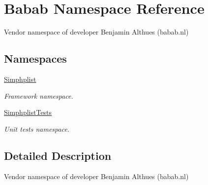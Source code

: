 \hypertarget{namespaceBabab}{\section{Babab Namespace Reference}
\label{namespaceBabab}
}


Vendor namespace of developer Benjamin Althues (babab.\+nl)  


\subsection*{Namespaces}
\begin{DoxyCompactItemize}
\item 
 \hyperlink{namespaceBabab_1_1Simphplist}{Simphplist}
\begin{DoxyCompactList}\small\item\em Framework namespace. \end{DoxyCompactList}\item 
 \hyperlink{namespaceBabab_1_1SimphplistTests}{Simphplist\+Tests}
\begin{DoxyCompactList}\small\item\em Unit tests namespace. \end{DoxyCompactList}\end{DoxyCompactItemize}


\subsection{Detailed Description}
Vendor namespace of developer Benjamin Althues (babab.\+nl) 